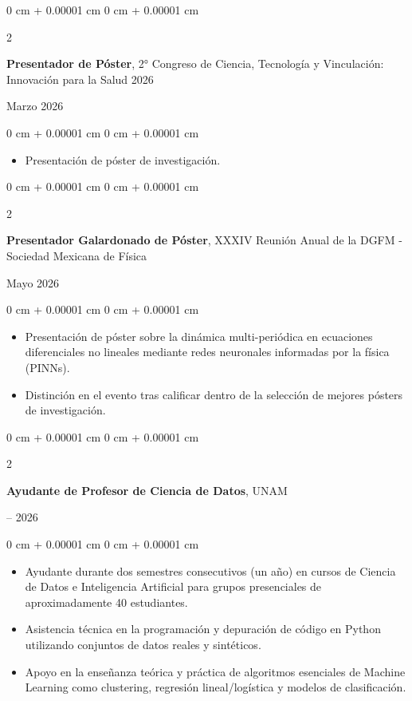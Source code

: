\documentclass[10pt, letterpaper]{article}
\newenvironment{highlights}{
    \begin{itemize}[
        topsep=0.10 cm,
        parsep=0.10 cm,
        partopsep=0pt,
        itemsep=0pt,
        leftmargin=0 cm + 10pt
    ]
}{
    \end{itemize}
} %
\newenvironment{onecolentry}{
    \begin{adjustwidth}{
        0 cm + 0.00001 cm
    }{
        0 cm + 0.00001 cm
    }
}{
    \end{adjustwidth}
} %
\newenvironment{twocolentry}[2][]{
    \onecolentry
    \def\secondColumn{#2}
    \setcolumnwidth{\fill, 4.5 cm}
    \begin{paracol}{2}
}{
    \switchcolumn \raggedleft \secondColumn
    \end{paracol}
    \endonecolentry
} %
\begin{document}
        
\begin{twocolentry}{Marzo 2026}
    \textbf{Presentador de Póster}, 2° Congreso de Ciencia, Tecnología y Vinculación: Innovación para la Salud 2026
\end{twocolentry}
\vspace{0.10 cm}
\begin{onecolentry}
    \begin{highlights}
        \item Presentación de póster de investigación.
    \end{highlights}
\end{onecolentry}
\begin{twocolentry}{Mayo 2026}
    \textbf{Presentador Galardonado de Póster}, XXXIV Reunión Anual de la DGFM - Sociedad Mexicana de Física
\end{twocolentry}
\vspace{0.10 cm}
\begin{onecolentry}
    \begin{highlights}
        \item Presentación de póster sobre la dinámica multi-periódica en ecuaciones diferenciales no lineales mediante redes neuronales informadas por la física (PINNs).
        \item Distinción en el evento tras calificar dentro de la selección de mejores pósters de investigación.
    \end{highlights}
\end{onecolentry}
\begin{twocolentry}{2025 -- 2026}
    \textbf{Ayudante de Profesor de Ciencia de Datos}, UNAM
\end{twocolentry}
\vspace{0.10 cm}
\begin{onecolentry}
    \begin{highlights}
        \item Ayudante durante dos semestres consecutivos (un año) en cursos de Ciencia de Datos e Inteligencia Artificial para grupos presenciales de aproximadamente 40 estudiantes.
        \item Asistencia técnica en la programación y depuración de código en Python utilizando conjuntos de datos reales y sintéticos.
        \item Apoyo en la enseñanza teórica y práctica de algoritmos esenciales de Machine Learning como clustering, regresión lineal/logística y modelos de clasificación.
    \end{highlights}
\end{onecolentry}
\end{document}
